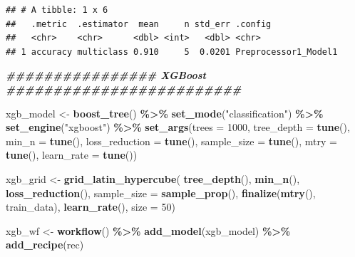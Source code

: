 \documentclass[
]{article}
\newenvironment{Shaded}{\begin{snugshade}}{\end{snugshade}}
\newcommand{\AttributeTok}[1]{\textcolor[rgb]{0.13,0.29,0.53}{#1}}
\newcommand{\DecValTok}[1]{\textcolor[rgb]{0.00,0.00,0.81}{#1}}
\newcommand{\DocumentationTok}[1]{\textcolor[rgb]{0.56,0.35,0.01}{\textbf{\textit{#1}}}}
\newcommand{\FunctionTok}[1]{\textcolor[rgb]{0.13,0.29,0.53}{\textbf{#1}}}
\newcommand{\NormalTok}[1]{#1}
\newcommand{\OtherTok}[1]{\textcolor[rgb]{0.56,0.35,0.01}{#1}}
\newcommand{\SpecialCharTok}[1]{\textcolor[rgb]{0.81,0.36,0.00}{\textbf{#1}}}
\newcommand{\StringTok}[1]{\textcolor[rgb]{0.31,0.60,0.02}{#1}}
\begin{document}
\begin{verbatim}
## # A tibble: 1 x 6
##   .metric  .estimator  mean     n std_err .config             
##   <chr>    <chr>      <dbl> <int>   <dbl> <chr>               
## 1 accuracy multiclass 0.910     5  0.0201 Preprocessor1_Model1
\end{verbatim}

\begin{Shaded}
\begin{Highlighting}[]
\DocumentationTok{\#\#\#\#\#\#\#\#\#\#\#\#\#\#\#\# XGBoost \#\#\#\#\#\#\#\#\#\#\#\#\#\#\#\#\#\#\#\#\#\#\#\#\#}

\NormalTok{xgb\_model }\OtherTok{\textless{}{-}} \FunctionTok{boost\_tree}\NormalTok{() }\SpecialCharTok{\%\textgreater{}\%}
  \FunctionTok{set\_mode}\NormalTok{(}\StringTok{"classification"}\NormalTok{) }\SpecialCharTok{\%\textgreater{}\%}
  \FunctionTok{set\_engine}\NormalTok{(}\StringTok{"xgboost"}\NormalTok{) }\SpecialCharTok{\%\textgreater{}\%} 
  \FunctionTok{set\_args}\NormalTok{(}\AttributeTok{trees =} \DecValTok{1000}\NormalTok{,}
           \AttributeTok{tree\_depth =} \FunctionTok{tune}\NormalTok{(),}
           \AttributeTok{min\_n =} \FunctionTok{tune}\NormalTok{(),}
           \AttributeTok{loss\_reduction =} \FunctionTok{tune}\NormalTok{(),}
           \AttributeTok{sample\_size =} \FunctionTok{tune}\NormalTok{(),}
           \AttributeTok{mtry =} \FunctionTok{tune}\NormalTok{(),}
           \AttributeTok{learn\_rate =} \FunctionTok{tune}\NormalTok{())}

\NormalTok{xgb\_grid }\OtherTok{\textless{}{-}} \FunctionTok{grid\_latin\_hypercube}\NormalTok{(}
                                \FunctionTok{tree\_depth}\NormalTok{(),}
                                \FunctionTok{min\_n}\NormalTok{(),}
                                \FunctionTok{loss\_reduction}\NormalTok{(),}
                                \AttributeTok{sample\_size =} \FunctionTok{sample\_prop}\NormalTok{(),}
                                \FunctionTok{finalize}\NormalTok{(}\FunctionTok{mtry}\NormalTok{(), train\_data),}
                                \FunctionTok{learn\_rate}\NormalTok{(),}
                                \AttributeTok{size =} \DecValTok{50}\NormalTok{)}

\NormalTok{xgb\_wf }\OtherTok{\textless{}{-}} \FunctionTok{workflow}\NormalTok{() }\SpecialCharTok{\%\textgreater{}\%} 
          \FunctionTok{add\_model}\NormalTok{(xgb\_model) }\SpecialCharTok{\%\textgreater{}\%} 
          \FunctionTok{add\_recipe}\NormalTok{(rec)}


\end{Highlighting}
\end{Shaded}
\end{document}
